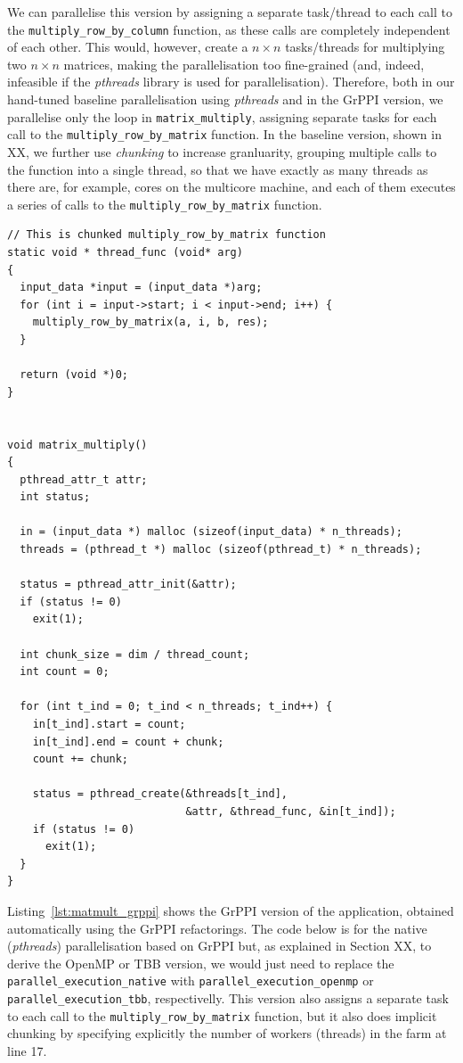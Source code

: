 \noindent
We can parallelise this version by assigning a separate task/thread to each call to the \lstinline{multiply_row_by_column} function, as these calls are completely independent of each other. This would, however, create a $n \times n$ tasks/threads for multiplying two $n \times n$ matrices, making the parallelisation too fine-grained (and, indeed, infeasible if the \emph{pthreads} library is used for parallelisation). Therefore, both in our hand-tuned baseline parallelisation using \emph{pthreads} and in the GrPPI version, we parallelise only the loop in \lstinline{matrix_multiply}, assigning separate tasks for each call to the \lstinline{multiply_row_by_matrix} function. In the baseline version, shown in XX, we further use \emph{chunking} to increase granluarity, grouping multiple calls to the function into a single thread, so that we have exactly as many threads as there are, for example, cores on the multicore machine, and each of them executes a series of calls to the \lstinline{multiply_row_by_matrix} function.

\begin{small}
  \begin{lstlisting}[caption=Baseline (\emph{pthreads}) Parallel Matrix Multiplication\label{lst:matmult_pthreads}]
// This is chunked multiply_row_by_matrix function    
static void * thread_func (void* arg)
{
  input_data *input = (input_data *)arg;
  for (int i = input->start; i < input->end; i++) {
    multiply_row_by_matrix(a, i, b, res);
  }

  return (void *)0;
}


void matrix_multiply()
{
  pthread_attr_t attr;
  int status;

  in = (input_data *) malloc (sizeof(input_data) * n_threads);
  threads = (pthread_t *) malloc (sizeof(pthread_t) * n_threads);

  status = pthread_attr_init(&attr);
  if (status != 0)
    exit(1);

  int chunk_size = dim / thread_count;
  int count = 0;

  for (int t_ind = 0; t_ind < n_threads; t_ind++) {
    in[t_ind].start = count;
    in[t_ind].end = count + chunk;
    count += chunk;

    status = pthread_create(&threads[t_ind],
                            &attr, &thread_func, &in[t_ind]);
    if (status != 0)
      exit(1);
  }
}
  \end{lstlisting}  
\end{small}

Listing~\ref{lst:matmult_grppi} shows the GrPPI version of the application, obtained automatically using the GrPPI refactorings. The code below is for the native (\emph{pthreads}) parallelisation based on GrPPI but, as explained in Section XX, to derive the OpenMP or TBB version, we would just need to replace the \lstinline{parallel_execution_native} with \lstinline{parallel_execution_openmp} or \lstinline{parallel_execution_tbb}, respectivelly. This version also assigns a separate task to each call to the \lstinline{multiply_row_by_matrix} function, but it also does implicit chunking by specifying explicitly the number of workers (threads) in the farm at line 17.


